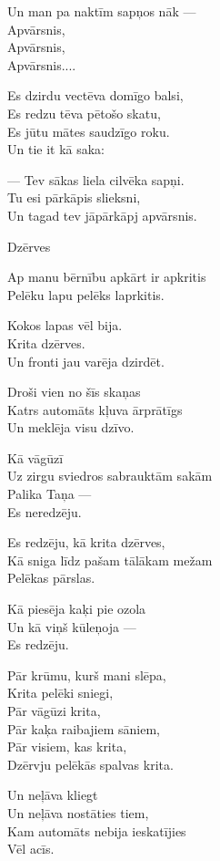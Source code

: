 \documentclass[14pt]{extarticle}
\begin{document}
Un man pa naktīm sapņos nāk ---\\
Apvārsnis,\\
Apvārsnis,\\
Apvārsnis....

Es dzirdu vectēva domīgo balsi,\\
Es redzu tēva pētošo skatu,\\
Es jūtu mātes saudzīgo roku.\\
Un tie it kā saka:

--- Tev sākas liela cilvēka sapņi.\\
Tu esi pārkāpis slieksni,\\
Un tagad tev jāpārkāpj apvārsnis.


\newpage

{\large \sc Dzērves}

Ap manu bērnību apkārt ir apkritis\\
Pelēku lapu pelēks laprkitis.

Kokos lapas vēl bija.\\
Krita dzērves.\\
Un fronti jau varēja dzirdēt.

Droši vien no šīs skaņas\\
Katrs automāts kļuva ārprātīgs\\
Un meklēja visu dzīvo.

Kā vāgūzī\\
Uz zirgu sviedros sabrauktām sakām\\
Palika Taņa ---\\
Es neredzēju.

Es redzēju, kā krita dzērves,\\
Kā sniga līdz pašam tālākam mežam\\
Pelēkas pārslas.

Kā piesēja kaķi pie ozola\\
Un kā viņš kūleņoja ---\\
Es redzēju.

Pār krūmu, kurš mani slēpa,\\
Krita pelēki sniegi,\\
Pār vāgūzi krita,\\
Pār kaķa raibajiem sāniem,\\
Pār visiem, kas krita,\\
Dzērvju pelēkās spalvas krita.

Un neļāva kliegt\\
Un neļāva nostāties tiem,\\
Kam automāts nebija ieskatījies\\
Vēl acīs.
\end{document}
